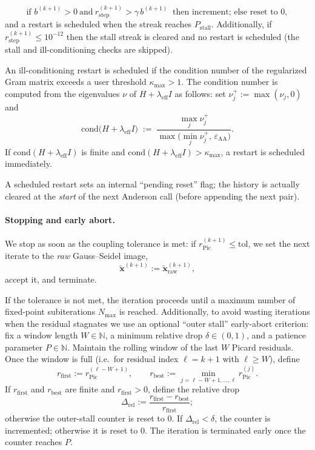 \[
\text{if } b^{(k+1)}>0\ \text{and}\ r_{\mathrm{step}}^{(k+1)} > \gamma\, b^{(k+1)}\ \text{ then increment; else reset to }0,
\]
and a restart is scheduled when the streak reaches $P_{\mathrm{stall}}$. Additionally, if $r_{\mathrm{step}}^{(k+1)}\le 10^{-12}$ then the stall streak is cleared and no restart is scheduled (the stall and ill-conditioning checks are skipped).

An ill-conditioning restart is scheduled if the condition number of the regularized Gram matrix exceeds a user threshold $\kappa_{\max}>1$.
The condition number is computed from the eigenvalues $\nu$ of $H+\lambda_{\mathrm{eff}}I$ as follows: set $\nu_j^{+}:=\max(\nu_j,0)$ and
\[
\mathrm{cond}\big(H+\lambda_{\mathrm{eff}}I\big)\;:=\;\frac{\max_j \nu_j^{+}}{\max\!\big(\min_j \nu_j^{+},\,\varepsilon_{\mathrm{AA}}\big)}.
\]
If $\mathrm{cond}(H+\lambda_{\mathrm{eff}}I)$ is finite and $\mathrm{cond}(H+\lambda_{\mathrm{eff}}I)>\kappa_{\max}$, a restart is scheduled immediately.

A scheduled restart sets an internal ``pending reset'' flag; the history is actually cleared at the \emph{start} of the next Anderson call (before appending the next pair).

\paragraph{Stopping and early abort.}
We stop as soon as the coupling tolerance is met:
if $r_{\mathrm{Pic}}^{(k+1)}\le \mathrm{tol}$, we set the next iterate to the \emph{raw} Gauss--Seidel image,
\[
\widetilde{\mathbf{x}}^{(k+1)} := \widetilde{\mathbf{x}}_{\mathrm{raw}}^{(k+1)},
\]
accept it, and terminate.

If the tolerance is not met, the iteration proceeds until a maximum number of fixed-point subiterations $N_{\max}$ is reached. Additionally, to avoid wasting iterations when the residual stagnates we use an optional ``outer stall'' early-abort criterion: fix a window length $W\in\mathbb{N}$, a minimum relative drop $\delta\in(0,1)$, and a patience parameter $P\in\mathbb{N}$. Maintain the rolling window of the last $W$ Picard residuals. Once the window is full (i.e.\ for residual index $\ell=k+1$ with $\ell\ge W$), define
\[
r_{\mathrm{first}} := r_{\mathrm{Pic}}^{(\ell-W+1)},\qquad
r_{\mathrm{best}} := \min_{j=\ell-W+1,\dots,\ell} r_{\mathrm{Pic}}^{(j)}.
\]
If $r_{\mathrm{first}}$ and $r_{\mathrm{best}}$ are finite and $r_{\mathrm{first}}>0$, define the relative drop
\[
\Delta_{\mathrm{rel}} := \frac{r_{\mathrm{first}}-r_{\mathrm{best}}}{r_{\mathrm{first}}};
\]
otherwise the outer-stall counter is reset to $0$. If $\Delta_{\mathrm{rel}}<\delta$, the counter is incremented; otherwise it is reset to $0$. The iteration is terminated early once the counter reaches $P$.

